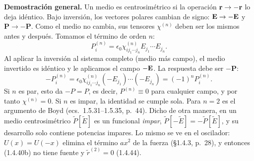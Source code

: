 \label{sol:36}

 \textbf{Demostración general.} Un medio es centrosimétrico si la operación $\mathbf r\to-\mathbf r$ lo deja idéntico. Bajo inversión, los vectores polares cambian de
signo: $\mathbf E\to-\mathbf E$ y $\mathbf P\to-\mathbf P$. Como el medio no cambia, sus tensores $\chi^{(n)}$ deben ser los mismos antes y después.
Tomamos el término de orden $n$:
\[
P_i^{(n)}=\epsilon_0\chi^{(n)}_{ij_1\cdots j_n}E_{j_1}\cdots E_{j_n}.
\]
Al aplicar la inversión al sistema completo (medio más campo), el medio invertido es idéntico y le aplicamos el campo $-\mathbf E$. La respuesta debe ser $-\mathbf P$:
\[
-P_i^{(n)}=\epsilon_0\chi^{(n)}_{ij_1\cdots j_n}(-E_{j_1})\cdots(-E_{j_n})=(-1)^n P_i^{(n)}.
\]
Si $n$ es par, esto da $-P=P$, es decir, $P^{(n)}\equiv0$ para cualquier campo, y por tanto $\chi^{(n)}=0$. Si $n$ es impar, la identidad se cumple sola.
Para $n=2$ es el argumento de Boyd (ecs.~1.5.31–1.5.35, p.~44). Dicho de otra manera, en un medio centrosimétrico $\tilde P[\tilde E]$ es un funcional
\emph{impar}, $\tilde P[-\tilde E]=-\tilde P[\tilde E]$, y su desarrollo solo contiene potencias impares. Lo mismo se ve en el oscilador:
$U(x)=U(-x)$ elimina el término $ax^2$ de la fuerza (§1.4.3, p.~28), y entonces (1.4.40b) no tiene fuente y $\tilde r^{(2)}=0$ (1.4.44).

